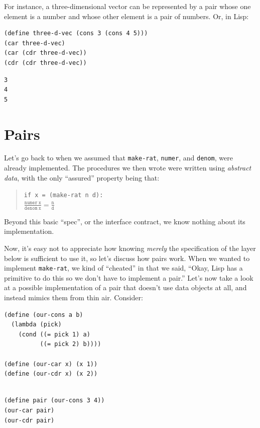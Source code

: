 \documentclass[9pt]{report}
\begin{document}
For instance, a three-dimensional vector can be represented by a
pair whose one element is a number and whose other element is a
pair of numbers. Or, in Lisp:

\begin{verbatim}
(define three-d-vec (cons 3 (cons 4 5)))
(car three-d-vec)
(car (cdr three-d-vec))
(cdr (cdr three-d-vec))
\end{verbatim}

\begin{verbatim}
3
4
5
\end{verbatim}

\section{Pairs}
\label{sec:orge377f10}

Let's go back to when we assumed that \texttt{make-rat}, \texttt{numer}, and
\texttt{denom}, were already implemented. The procedures we then wrote
were written using \emph{abstract data}, with the only ``assured''
property being that:

\begin{verse}
\texttt{if x = (make-rat n d):}\\
\vspace*{1em}
\hspace*{2em}\(\displaystyle \frac{\mathtt{numer~x}}{\mathtt{denom~x}} = \frac{\mathtt{n}}{\mathtt{d}}\)\\
\end{verse}

Beyond this basic ``spec'', or the interface contract, we know
nothing about its implementation.

Now, it's easy not to appreciate how knowing \emph{merely} the
specification of the layer below is sufficient to use it, so let's
discuss how pairs work. When we wanted to implement \texttt{make-rat}, we
kind of ``cheated'' in that we said, ``Okay, Lisp has a primitive to
do this so we don't have to implement a pair.'' Let's now take a
look at a possible implementation of a pair that doesn't use data
objects at all, and instead mimics them from thin air. Consider:

\begin{verbatim}
(define (our-cons a b)
  (lambda (pick)
    (cond ((= pick 1) a)
          ((= pick 2) b))))

(define (our-car x) (x 1))
(define (our-cdr x) (x 2))
\end{verbatim}

\begin{verbatim}

(define pair (our-cons 3 4))
(our-car pair)
(our-cdr pair)
\end{verbatim}
\end{document}
